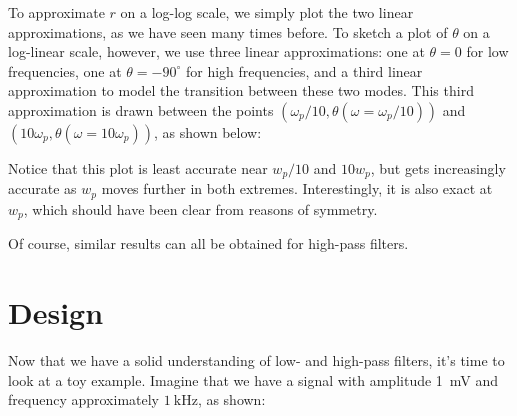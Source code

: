 \documentclass[letterpaper]{article}
\theoremstyle{remark}
\begin{document}
To approximate $r$ on a log-log scale, we simply plot the two linear approximations, as we have seen many times before. To sketch a plot of $\theta$ on a log-linear scale, however, we use three linear approximations: one at $\theta = 0$ for low frequencies, one at $\theta = -90^\circ$ for high frequencies, and a third linear approximation to model the transition between these two modes. This third approximation is drawn between the points $(\omega_p / 10, \theta(\omega = \omega_p / 10))$ and $(10\omega_p, \theta(\omega = 10\omega_p))$, as shown below:
\begin{center}
\end{center}
Notice that this plot is least accurate near $w_p / 10$ and $10w_p$, but gets increasingly accurate as $w_p$ moves further in both extremes. Interestingly, it is also exact at $w_p$, which should have been clear from reasons of symmetry.

Of course, similar results can all be obtained for high-pass filters.

\section{Design}
Now that we have a solid understanding of low- and high-pass filters, it's time to look at a toy example. Imagine that we have a signal with amplitude \SI{1}{\milli\volt} and frequency approximately $\SI{1}{\kilo\hertz}$, as shown:
\begin{center}
\end{center}
\end{document}
